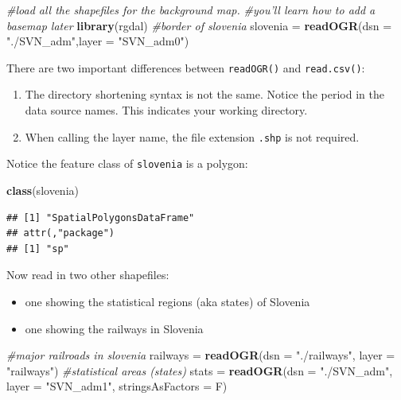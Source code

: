 \documentclass[]{book}
\newenvironment{Shaded}{\begin{snugshade}}{\end{snugshade}}
\newcommand{\KeywordTok}[1]{\textcolor[rgb]{0.13,0.29,0.53}{\textbf{#1}}}
\newcommand{\DataTypeTok}[1]{\textcolor[rgb]{0.13,0.29,0.53}{#1}}
\newcommand{\StringTok}[1]{\textcolor[rgb]{0.31,0.60,0.02}{#1}}
\newcommand{\CommentTok}[1]{\textcolor[rgb]{0.56,0.35,0.01}{\textit{#1}}}
\newcommand{\NormalTok}[1]{#1}
\providecommand{\tightlist}{%
  \setlength{\itemsep}{0pt}\setlength{\parskip}{0pt}}
\theoremstyle{definition}
\theoremstyle{definition}
\theoremstyle{definition}
\theoremstyle{remark}
\begin{document}
\begin{Shaded}
\begin{Highlighting}[]
\CommentTok{#load all the shapefiles for the background map. }
\CommentTok{#you'll learn how to add a basemap later}
\KeywordTok{library}\NormalTok{(rgdal)}
\CommentTok{#border of slovenia}
\NormalTok{slovenia =}\StringTok{ }\KeywordTok{readOGR}\NormalTok{(}\DataTypeTok{dsn =} \StringTok{"./SVN_adm"}\NormalTok{,}\DataTypeTok{layer =} \StringTok{"SVN_adm0"}\NormalTok{)}
\end{Highlighting}
\end{Shaded}

There are two important differences between \texttt{readOGR()} and
\texttt{read.csv()}:

\begin{enumerate}
\def\labelenumi{\arabic{enumi}.}
\tightlist
\item
  The directory shortening syntax is not the same. Notice the period in
  the data source names. This indicates your working directory.
\item
  When calling the layer name, the file extension \texttt{.shp} is not
  required.
\end{enumerate}

Notice the feature class of \texttt{slovenia} is a polygon:

\begin{Shaded}
\begin{Highlighting}[]
\KeywordTok{class}\NormalTok{(slovenia)}
\end{Highlighting}
\end{Shaded}

\begin{verbatim}
## [1] "SpatialPolygonsDataFrame"
## attr(,"package")
## [1] "sp"
\end{verbatim}

Now read in two other shapefiles:

\begin{itemize}
\tightlist
\item
  one showing the statistical regions (aka states) of Slovenia
  \citep{svn-cite}
\item
  one showing the railways in Slovenia \citep{rail-cite}
\end{itemize}

\begin{Shaded}
\begin{Highlighting}[]
\CommentTok{#major railroads in slovenia}
\NormalTok{railways =}\StringTok{ }\KeywordTok{readOGR}\NormalTok{(}\DataTypeTok{dsn =} \StringTok{"./railways"}\NormalTok{,}
                   \DataTypeTok{layer =} \StringTok{"railways"}\NormalTok{) }
\CommentTok{#statistical areas (states)}
\NormalTok{stats =}\StringTok{ }\KeywordTok{readOGR}\NormalTok{(}\DataTypeTok{dsn =} \StringTok{"./SVN_adm"}\NormalTok{,}
                \DataTypeTok{layer =} \StringTok{"SVN_adm1"}\NormalTok{, }\DataTypeTok{stringsAsFactors =}\NormalTok{ F)  }
\end{Highlighting}
\end{Shaded}
\end{document}
